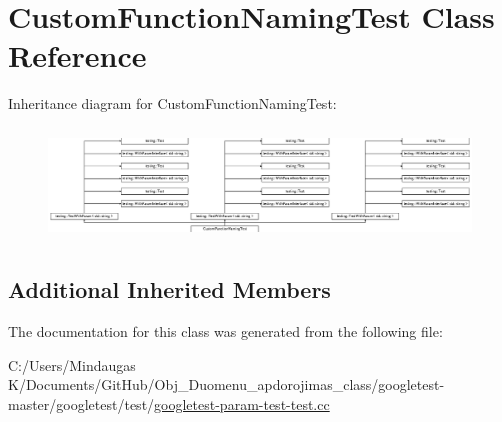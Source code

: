 \hypertarget{class_custom_function_naming_test}{}\section{Custom\+Function\+Naming\+Test Class Reference}
\label{class_custom_function_naming_test}
Inheritance diagram for Custom\+Function\+Naming\+Test\+:\begin{figure}[H]
\begin{center}
\leavevmode
\includegraphics[height=2.998662cm]{d7/dba/class_custom_function_naming_test}
\end{center}
\end{figure}
\subsection*{Additional Inherited Members}


The documentation for this class was generated from the following file\+:\begin{DoxyCompactItemize}
\item 
C\+:/\+Users/\+Mindaugas K/\+Documents/\+Git\+Hub/\+Obj\+\_\+\+Duomenu\+\_\+apdorojimas\+\_\+class/googletest-\/master/googletest/test/\mbox{\hyperlink{googletest-master_2googletest_2test_2googletest-param-test-test_8cc}{googletest-\/param-\/test-\/test.\+cc}}\end{DoxyCompactItemize}
